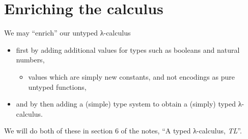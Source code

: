 \documentclass[11pt]{article}
\theoremstyle{definition}
\begin{document}
\section{Enriching the calculus}
\label{sec:org09adf5b}

We may “enrich” our untyped λ-calculus
\begin{itemize}
\item first by adding additional values for types such as
booleans and natural numbers,
\begin{itemize}
\item values which are simply new constants,
and not encodings as pure untyped functions,
\end{itemize}
\item and by then adding a (simple) type system to obtain a
(simply) typed λ-calculus.
\end{itemize}

We will do both of these in section 6 of the notes,
“A typed λ-calculus, \emph{TL}”. 
\end{document}
